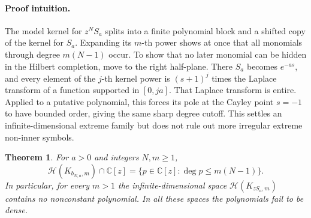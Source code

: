 \documentclass[11pt]{article}
\newtheorem{theorem}{Theorem}
\newcommand{\C}{\mathbb C}
\newcommand{\Hh}{\mathcal H}
\begin{document}
\paragraph{Proof intuition.}
The model kernel for $z^NS_a$ splits into a finite polynomial block and a
shifted copy of the kernel for $S_a$.  Expanding its $m$-th power shows at once
that all monomials through degree $m(N-1)$ occur.  To show that no later
monomial can be hidden in the Hilbert completion, move to the right half-plane.
There $S_a$ becomes $e^{-as}$, and every element of the $j$-th kernel power is
$(s+1)^j$ times the Laplace transform of a function supported in $[0,ja]$.
That Laplace transform is entire.  Applied to a putative polynomial, this
forces its pole at the Cayley point $s=-1$ to have bounded order, giving the
same sharp degree cutoff.  This settles an infinite-dimensional extreme
family but does not rule out more irregular extreme non-inner symbols.

\begin{theorem}\label{thm:main}
For $a>0$ and integers $N,m\geq1$,
\[
 \Hh(K_{b_{N,a},m})\cap\C[z]
 =\{p\in\C[z]:\deg p\leq m(N-1)\}.
\]
In particular, for every $m>1$ the infinite-dimensional space
$\Hh(K_{zS_a,m})$ contains no nonconstant polynomial.  In all these spaces the
polynomials fail to be dense.
\end{theorem}
\end{document}
